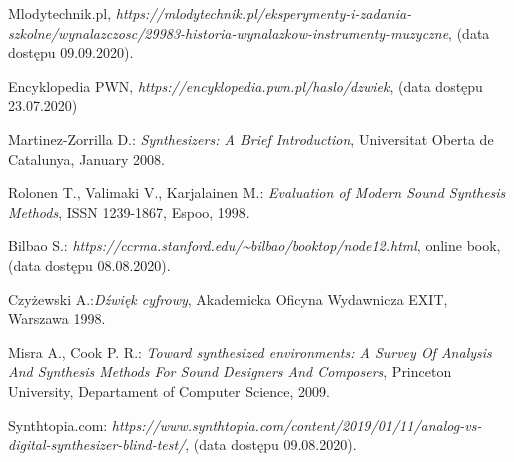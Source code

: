 \documentclass[nostrict]{szablonPG}
\newcommand\blankpage{%
	\null
	\thispagestyle{empty}%
	\addtocounter{page}{-1}%
	\newpage}
\begin{document}
\afterpage{\blankpage}

\afterpage{\blankpage}


	\setcounter{page}{3}
	\let\cleardoublepage\clearpage
	
	
	
	
	
	
	
	
	
	
	
%	
	
	
%	
%	
	

	\listoffigures      %
	\listoftables

	\begin{thebibliography}{20}                      %
		\small              %
		Mlodytechnik.pl, \emph{https://mlodytechnik.pl/eksperymenty-i-zadania-szkolne/wynalazczosc/29983-historia-wynalazkow-instrumenty-muzyczne}, (data dostępu 09.09.2020).
		
		Encyklopedia PWN, \emph{https://encyklopedia.pwn.pl/haslo/dzwiek}, (data dostępu 23.07.2020)
		
		Martinez-Zorrilla D.: \emph{Synthesizers: A Brief Introduction}, Universitat Oberta de Catalunya, January 2008.

		Rolonen T., Valimaki V., Karjalainen M.: \emph{Evaluation of Modern Sound Synthesis Methods}, ISSN 1239-1867, Espoo, 1998.

		Bilbao S.: \emph{https://ccrma.stanford.edu/\textasciitilde bilbao/booktop/node12.html}, online book, (data dostępu 08.08.2020).
		
		Czyżewski A.:\emph{Dźwięk cyfrowy}, Akademicka Oficyna Wydawnicza EXIT, Warszawa 1998.
		 
		Misra A., Cook P. R.: \emph{Toward synthesized environments: A Survey Of Analysis And Synthesis Methods For Sound Designers And Composers}, Princeton University, Departament of Computer Science, 2009.
		
		Synthtopia.com: \emph{https://www.synthtopia.com/content/2019/01/11/analog-vs-digital-synthesizer-blind-test/}, (data dostępu 09.08.2020).


\end{thebibliography}
\end{document}
